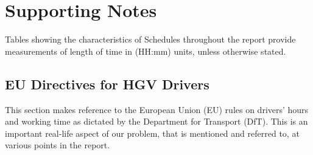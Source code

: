 \chapter{Supporting Notes}

Tables showing the characteristics of Schedules throughout the report provide measurements of length of time in (HH:mm) units, unless otherwise stated.




\section{EU Directives for HGV Drivers}
\label{section: EU rules}
This section makes reference to the  European Union (EU) rules on drivers' hours and working time as dictated by the Department for Transport (DfT). This is an important real-life aspect of our problem, that is mentioned and referred to, at various points in the report. %

